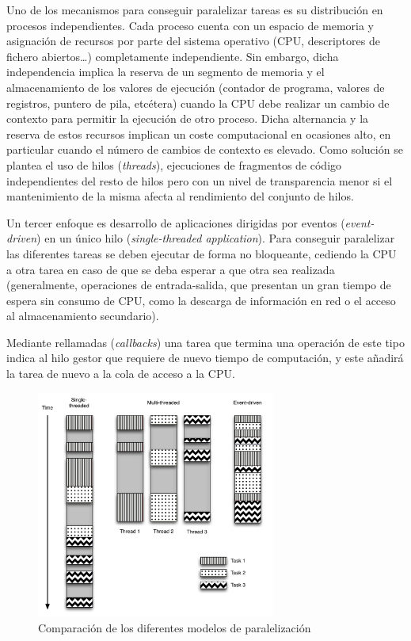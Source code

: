 Uno de los mecanismos para conseguir paralelizar tareas es su distribución en procesos independientes. Cada proceso cuenta con un espacio de memoria y asignación de recursos por parte del sistema operativo (CPU, descriptores de fichero abiertos\dots) completamente independiente. Sin embargo, dicha independencia implica la reserva de un segmento de memoria y el almacenamiento de los valores de ejecución (contador de programa, valores de registros, puntero de pila, etcétera) cuando la CPU debe realizar un cambio de contexto para permitir la ejecución de otro proceso. Dicha alternancia y la reserva de estos recursos implican un coste computacional en ocasiones alto, en particular cuando el número de cambios de contexto es elevado. Como solución se plantea el uso de hilos (\textit{threads}), ejecuciones de fragmentos de código independientes del resto de hilos pero con un nivel de transparencia menor si el mantenimiento de la misma afecta al rendimiento del conjunto de hilos.

\label{teoria:singlethread}
Un tercer enfoque es desarrollo de aplicaciones dirigidas por eventos (\textit{event-driven}) en un único hilo (\textit{single-threaded application}). Para conseguir paralelizar las diferentes tareas se deben ejecutar de forma no bloqueante, cediendo la CPU a otra tarea en caso de que se deba esperar a que otra sea realizada (generalmente, operaciones de entrada-salida, que presentan un gran tiempo de espera sin consumo de CPU, como la descarga de información en red o el acceso al almacenamiento secundario).


Mediante rellamadas (\textit{callbacks}) una tarea que termina una operación de este tipo indica al hilo gestor que requiere de nuevo tiempo de computación, y este añadirá la tarea de nuevo a la cola de acceso a la CPU.

\begin{figure}[H]
  \centering
  \includegraphics[width=0.7\textwidth]{Chapter2/Figures/threadcomparison}
  \caption[Modelos de paralelización]{Comparación de los diferentes modelos de paralelización}
  \label{fig:threadcomparison}
\end{figure}

